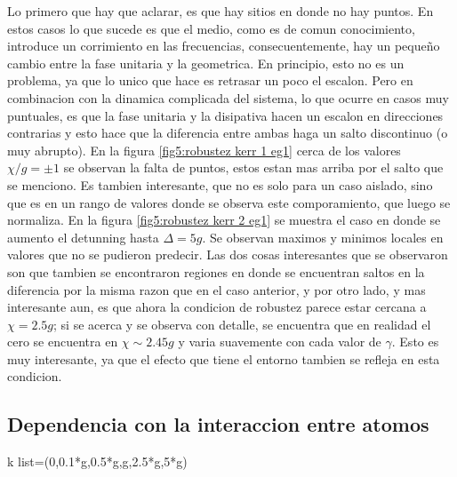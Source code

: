 Lo primero que hay que aclarar, es que hay sitios en donde no hay puntos. En estos casos lo que sucede es que el medio, como es de comun conocimiento, introduce un corrimiento en las frecuencias, consecuentemente, hay un pequeño cambio entre la fase unitaria y la geometrica. En principio, esto no es un problema, ya que lo unico que hace es retrasar un poco el escalon. Pero en combinacion con la dinamica complicada del sistema, lo que ocurre en casos muy puntuales, es que la fase unitaria y la disipativa hacen un escalon en direcciones contrarias y esto hace que la diferencia entre ambas haga un salto discontinuo (o muy abrupto). En la figura \ref{fig5:robustez kerr 1 eg1} cerca de los valores $\chi/g=\pm 1$ se observan la falta de puntos, estos estan mas arriba por el salto que se menciono. Es tambien interesante, que no es solo para un caso aislado, sino que es en un rango de valores donde se observa este comporamiento, que luego se normaliza. 
En la figura \ref{fig5:robustez kerr 2 eg1} se muestra el caso en donde se aumento el detunning hasta $\Delta=5g$. Se observan maximos y minimos locales en valores que no se pudieron predecir. Las dos cosas interesantes que se observaron son que tambien se encontraron regiones en donde se encuentran saltos en la diferencia por la misma razon que en el caso anterior, y por otro lado, y mas interesante aun, es que ahora la condicion de robustez parece estar cercana a $\chi=2.5g$; si se acerca y se observa con detalle, se encuentra que en realidad el cero se encuentra en $\chi\sim 2.45g$ y varia suavemente con cada valor de $\gamma$. Esto es muy interesante, ya que el efecto que tiene el entorno tambien se refleja en esta condicion.

\subsection{Dependencia con la interaccion entre atomos}
k list=(0,0.1*g,0.5*g,g,2.5*g,5*g)


